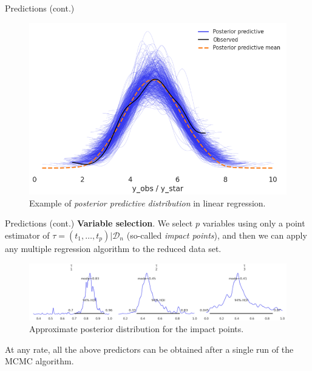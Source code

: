 \documentclass[10pt, english, professionalfonts]{beamer}
\begin{document}
\begin{frame}{Predictions (cont.)}
    \vspace{1em}
  \begin{figure}
    \includegraphics[width=.75\textwidth]{img/ppc_lin_standalone}
    \caption{Example of \textit{posterior predictive distribution} in linear regression.}
  \end{figure}
\end{frame}

\begin{frame}{Predictions (cont.)}
    \textbf{Variable selection}. We select \(p\) variables using only a point estimator of \(\tau=(t_1,\dots, t_p)|\mathcal D_n\) (so-called \textit{impact points}), and then we can apply any multiple regression algorithm to the reduced data set.
    \vspace{1em}

    \begin{figure}
      \includegraphics[width=\textwidth]{img/tau_posterior}
      \caption{Approximate posterior distribution for the impact points.}
    \end{figure}

    At any rate, all the above predictors can be obtained after a single run of the MCMC algorithm.
\end{frame}

%
\end{document}
